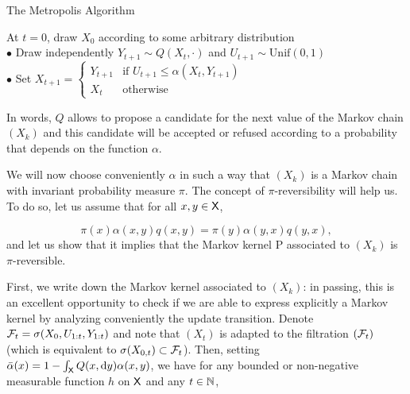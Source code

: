 \documentclass[english,graybox,envcountchap,envcountsame,sectrefs,shortlabels]{svmono}
\theoremstyle{style}
\begin{document}
\begin{algorithm}
\caption{\label{alg:mh}The Metropolis Algorithm}

{}
\BlankLine
At $t=0$, draw $X_{0}$ according to some arbitrary distribution\\
{
$\bullet$ Draw independently $Y_{t+1}\sim Q(X_{t},\cdot)$ and $U_{t+1}\sim\mathrm{Unif}(0,1)$\\
$\bullet$ Set $X_{t+1}=\begin{cases} Y_{t+1} & \mbox{if }U_{t+1}\leq\alpha(X_{t},Y_{t+1})\\ X_{t} & \mbox{otherwise} \end{cases}$
}
\end{algorithm}
 In words, $Q$ allows to propose a candidate for the next value of
the Markov chain $(X_{k})$ and this candidate will be accepted or
refused according to a probability that depends on the function $\alpha$.

We will now choose conveniently $\alpha$ in such a way that $(X_{k})$
is a Markov chain with invariant probability measure $\pi$. The concept
of $\pi$-reversibility will help us. To do so, let us assume that
for all $x,y\in\mathsf{X}$,

\begin{equation}
\pi(x)\alpha(x,y)q(x,y)=\pi(y)\alpha(y,x)q(y,x),\label{eq:balance}
\end{equation}
and let us show that it implies that the Markov kernel P associated
to $(X_{k})$ is $\pi$-reversible.

First, we write down the Markov kernel associated to $(X_{k})$: in
passing, this is an excellent opportunity to check if we are able
to express explicitly a Markov kernel by analyzing conveniently the
update transition. Denote $\mathcal{F}_{t}=\sigma(X_{0},U_{1:t},Y_{1:t})$
and note that $(X_{t})$ is adapted to the filtration $(\mathcal{F}_{t})$
(which is equivalent to $\sigma(X_{0,t})\subset\mathcal{F}_{t}$). Then,
setting $\bar{\alpha}(x)=1-\int_{\mathsf{X}}Q(x,\mathrm{d} y)\alpha(x,y)$, we
have for any bounded or non-negative measurable function $h$ on $\mathsf{X}$
and any $t\in\mathbb{N}$,
\end{document}
